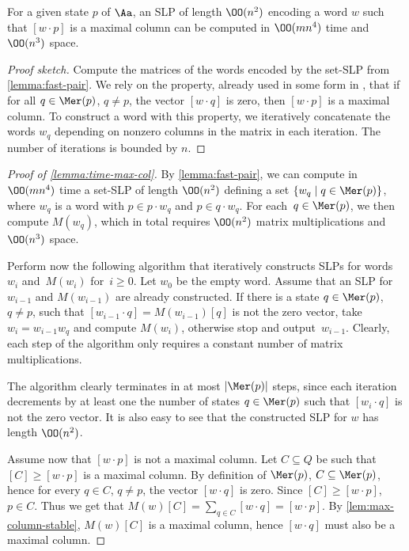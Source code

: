 \begin{lem}\label{lemma:time-max-col}
    For a given state $p$ of $\Aa$, an SLP of length $\OO(n^2)$ encoding a word $w$ such that $[w \cdot p]$ is a maximal column can be computed in $\OO(mn^4)$ time and $\OO(n^3)$ space.
\end{lem}
\begin{proof}[Proof sketch]
Compute the matrices of the words encoded by the set-SLP from \autoref{lemma:fast-pair}. 
We rely on the property, already used in some form in \cite{Carpi1988}, that if for all $q \in \Mer(p)$, $q \ne p$, the vector $[w \cdot q]$ is zero, then $[w \cdot p]$ is a maximal column. To construct a word with this property, we iteratively concatenate the words $w_q$ depending on nonzero columns in the matrix in each iteration. The number of iterations is bounded by $n$.
\end{proof}

\begin{proof}[Proof of \autoref{lemma:time-max-col}]
By \autoref{lemma:fast-pair}, 
we can compute in $\OO(mn^4)$ time a set-SLP of length $\OO(n^2)$ defining a set $\{w_q \mid q \in \Mer(p)\}$, where $w_q$ is a word with $p \in p \cdot w_q$ and $p \in q \cdot w_q$. For each~$q \in \Mer(p)$, we then compute $M(w_q)$, which in total requires $\OO(n^2)$ matrix multiplications and $\OO(n^3)$ space.

Perform now the following algorithm that iteratively constructs SLPs for words $w_i$ and~$M(w_i)$ for~$i \ge 0$. Let $w_0$ be the empty word. Assume that an SLP for $w_{i - 1}$ and $M(w_{i - 1})$ are already constructed. If there is a state $q \in \Mer(p)$, $q \ne p$, such that $[w_{i - 1} \cdot q] = M(w_{i - 1})[q]$ is not the zero vector, take $w_i = w_{i - 1} w_q$ and compute $M(w_i)$, otherwise stop and output~$w_{i - 1}$. Clearly, each step of the algorithm only requires a constant number of matrix multiplications.

The algorithm clearly terminates in at most $|\Mer(p)|$ steps, since each iteration decrements by at least one the number of states $q \in \Mer(p)$ such that $[w_i \cdot q]$ is not the zero vector. It is also easy to see that the constructed SLP for $w$ has length $\OO(n^2)$.

Assume now that $[w \cdot p]$ is not a maximal column. Let $C \subseteq Q$ be such that $[C] \ge [w \cdot p]$ is a maximal column. By definition of $\Mer(p)$, $C \subseteq \Mer(p)$, hence for every $q \in C$, $q \ne p$, the vector $[w \cdot q]$ is zero. Since $[C] \ge [w \cdot p]$, $p \in C$. Thus we get that $M(w)[C] = \sum_{q \in C} [w \cdot q] = [w \cdot p]$.
By \autoref{lem:max-column-stable}, $M(w)[C]$ is a maximal column, hence $[w \cdot q]$ must also be a maximal column. 
\end{proof}



